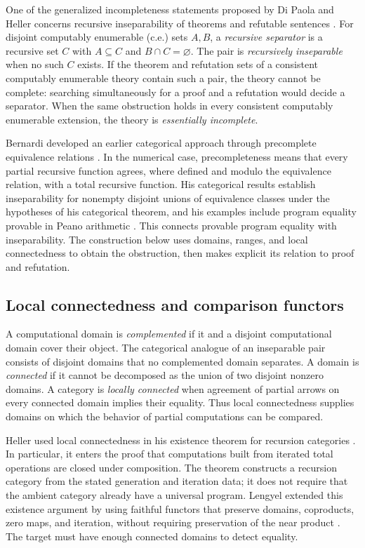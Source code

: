 \documentclass[11pt]{article}
\begin{document}
One of the generalized incompleteness statements proposed by
Di Paola and Heller concerns recursive inseparability of theorems and
refutable sentences \cite[pp.~594--595]{DPH}.
For disjoint computably enumerable (c.e.) sets $A,B$, a \emph{recursive
separator} is a recursive set $C$ with $A\subseteq C$ and
$B\cap C=\varnothing$. The pair is \emph{recursively inseparable}
when no such $C$ exists. If the theorem and refutation sets of a
consistent computably enumerable theory contain such a pair,
the theory cannot be complete: searching simultaneously for a proof
and a refutation would decide a separator. When the same obstruction
holds in every consistent computably enumerable extension, the theory
is \emph{essentially incomplete}.

Bernardi developed an earlier categorical approach through precomplete
equivalence relations \cite{Bernardi}. In the numerical case,
precompleteness means that every partial recursive function agrees,
where defined and modulo the equivalence relation, with a total
recursive function. His categorical results establish inseparability
for nonempty disjoint unions of equivalence classes under the
hypotheses of his categorical theorem, and his examples include program equality
provable in Peano arithmetic \cite[pp.~125--128]{Bernardi}. This connects provable
program equality with inseparability. The construction below uses
domains, ranges, and local connectedness to obtain the obstruction,
then makes explicit its relation to proof and refutation.

\subsection{Local connectedness and comparison functors}

A computational domain is \emph{complemented} if it and a disjoint
computational domain cover their object. The categorical analogue of
an inseparable pair consists of disjoint domains that no complemented
domain separates. A domain is \emph{connected} if it cannot be
decomposed as the union of two disjoint nonzero domains.
A category is \emph{locally connected} when agreement of partial
arrows on every connected domain implies their equality.
Thus local connectedness supplies domains on which the behavior of
partial computations can be compared.

Heller used local connectedness in his existence theorem for recursion
categories \cite[Sections 8--9]{Heller}. In particular, it enters the
proof that computations built from iterated total operations are closed
under composition. The theorem constructs a recursion category from
the stated generation and iteration data; it does not require that
the ambient category already have a universal program.
Lengyel extended this existence argument by using faithful functors
that preserve domains, coproducts, zero maps, and iteration, without
requiring preservation of the near product \cite{Lengyel2004,Corrections}.
The target must have enough connected domains to detect equality.
\end{document}
